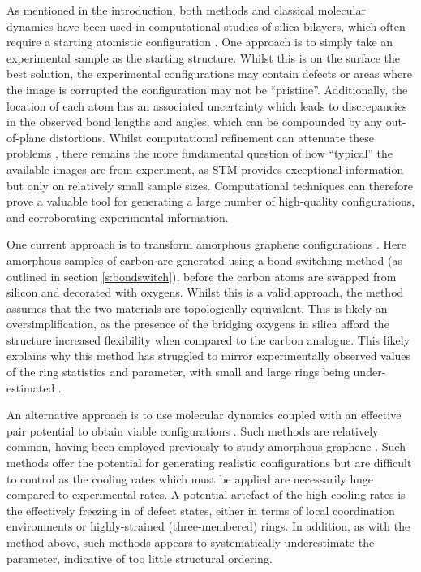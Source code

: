 As mentioned in the  introduction, both \abinitio{} methods and classical molecular dynamics have been used in computational studies of silica bilayers, which often require a starting atomistic configuration  \cite{Bjorkman2013,Malashevich2016,Wilson2013,Roy2018}.  
One approach is to simply take an experimental sample as the starting structure. 
Whilst this is on the surface the best solution, the experimental configurations may contain defects or areas where the image is corrupted \ie{} the configuration may not be ``pristine''.
Additionally, the location of each atom has an associated uncertainty which leads to discrepancies in the observed bond lengths and angles, which can be compounded by any out\--of\--plane distortions.
Whilst computational refinement can attenuate these problems \cite{Sadjadi2017,Wilson2018}, there remains the more fundamental question of how ``typical'' the available images are from experiment, as STM provides exceptional information but only on relatively small sample sizes.
Computational techniques can therefore prove a valuable tool for generating a large number of high\--quality configurations, and corroborating experimental information.  

One current approach is to transform amorphous graphene configurations \cite{Wilson2013}.
Here amorphous samples of carbon are generated using a bond switching method (as outlined in section \ref{s:bondswitch}), before the carbon atoms are swapped from silicon and decorated with oxygens.
Whilst this is a valid approach, the method assumes that the two materials are topologically equivalent.
This is likely an oversimplification, as the presence of the bridging oxygens in silica afford the structure increased flexibility when compared to the carbon analogue.
This likely explains why this method has struggled to mirror experimentally observed values of the ring statistics and \aw{} parameter, with small and large rings being under\--estimated \cite{Kumar2014}.

An alternative approach is to use molecular dynamics coupled with an effective pair potential to obtain viable configurations \cite{Roy2018}.
Such methods are relatively common, having been employed previously to study amorphous graphene \cite{Kumar2012}. 
Such methods offer the potential for generating realistic configurations but are difficult to control as the cooling rates which must be applied are necessarily huge compared to experimental rates. 
A potential artefact of the high cooling rates is the effectively freezing in of defect states, either in terms of local coordination environments or highly\--strained (three-membered) rings.
In addition, as with the method above, such methods appears to systematically underestimate the \aw{} parameter, indicative of too little structural ordering.

